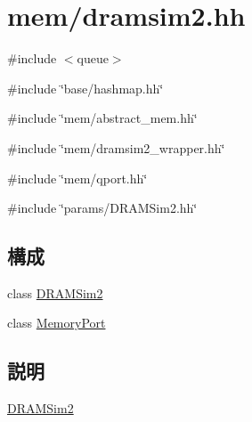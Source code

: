 \hypertarget{dramsim2_8hh}{
\section{mem/dramsim2.hh}
\label{dramsim2_8hh}
}
{\ttfamily \#include $<$queue$>$}\par
{\ttfamily \#include \char`\"{}base/hashmap.hh\char`\"{}}\par
{\ttfamily \#include \char`\"{}mem/abstract\_\-mem.hh\char`\"{}}\par
{\ttfamily \#include \char`\"{}mem/dramsim2\_\-wrapper.hh\char`\"{}}\par
{\ttfamily \#include \char`\"{}mem/qport.hh\char`\"{}}\par
{\ttfamily \#include \char`\"{}params/DRAMSim2.hh\char`\"{}}\par
\subsection*{構成}
\begin{DoxyCompactItemize}
\item 
class \hyperlink{classDRAMSim2}{DRAMSim2}
\item 
class \hyperlink{classDRAMSim2_1_1MemoryPort}{MemoryPort}
\end{DoxyCompactItemize}


\subsection{説明}
\hyperlink{classDRAMSim2}{DRAMSim2} 